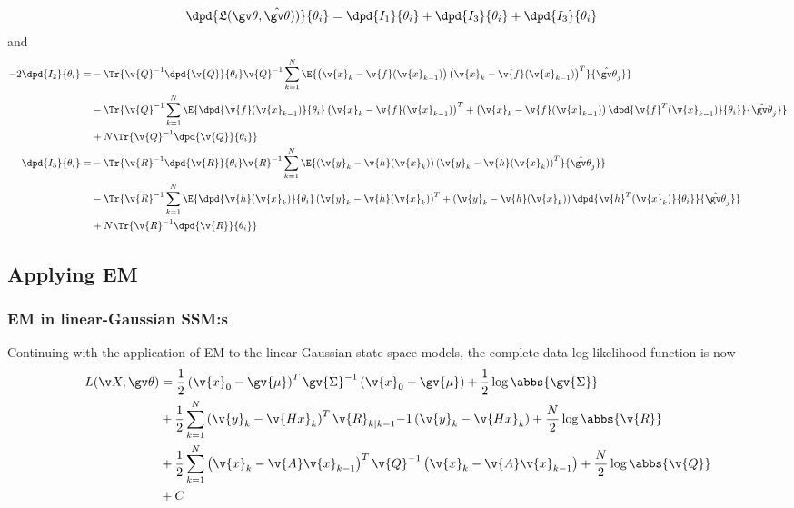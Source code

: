 \begin{align}
	\dpd{\Lb(\Th,\hat{\Th}))}{\theta_i}&=\dpd{I_1}{\theta_i}+\dpd{I_3}{\theta_i}+\dpd{I_3}{\theta_i}
	\label{eq:dLB_nonlinear_1}
\end{align}
and
\begin{align}
\begin{split}
	-2\dpd{I_2}{\theta_i}
	=&-\Tr{\v{Q}^{-1}\dpd{\v{Q}}{\theta_i}\v{Q}^{-1}
	\sum_{k=1}^N\E{\left(\v{x}_k-\v{f}(\v{x}_{k-1})\right)\left(\v{x}_k-\v{f}(\v{x}_{k-1})\right)^T}{\hat{\Th}_j}}\\
	&-\Tr{\v{Q}^{-1}\sum_{k=1}^N\E{\dpd{\v{f}(\v{x}_{k-1})}{\theta_i}\left(\v{x}_k-\v{f}(\v{x}_{k-1})\right)^T+\left(\v{x}_k-\v{f}(\v{x}_{k-1})\right)\dpd{\v{f}^T(\v{x}_{k-1})}{\theta_i}}{\hat{\Th}_j}}\\
	&+N\Tr{\v{Q}^{-1}\dpd{\v{Q}}{\theta_i}}\\
	\dpd{I_3}{\theta_i}=&
	-\Tr{\v{R}^{-1}\dpd{\v{R}}{\theta_i}\v{R}^{-1}
	\sum_{k=1}^N\E{\left(\v{y}_k-\v{h}(\v{x}_{k})\right)\left(\v{y}_k-\v{h}(\v{x}_{k})\right)^T}{\hat{\Th}_j}}\\
	&-\Tr{\v{R}^{-1}\sum_{k=1}^N\E{\dpd{\v{h}(\v{x}_{k})}{\theta_i}\left(\v{y}_k-\v{h}(\v{x}_{k})\right)^T+\left(\v{y}_k-\v{h}(\v{x}_{k})\right)\dpd{\v{h}^T(\v{x}_{k})}{\theta_i}}{\hat{\Th}_j}}\\
	&+N\Tr{\v{R}^{-1}\dpd{\v{R}}{\theta_i}}\\
	\label{eq:dLB_nonlinear}
\end{split}
\end{align}

\subsection{Applying EM}%

\subsubsection{EM in linear-Gaussian SSM:s}
\parencite{shumway1982approach,Ghahramani1996}
Continuing with the application of EM to the linear-Gaussian state space models, 
the complete-data log-likelihood function is now
\begin{align}
\label{eq:clLH}
\begin{split}
	L(\X,\Th)&=
	\frac{1}{2}\left(\v{x}_0-\gv{\mu}\right)^T\gv{\Sigma}^{-1}\left(\v{x}_0-\gv{\mu}\right)+\frac{1}{2}\log\abbs{\gv{\Sigma}}\\
	&+\frac{1}{2}\sum_{k=1}^N\left(\v{y}_k-\v{Hx}_k\right)^T\v{R}_{k|k-1}{-1}\left(\v{y}_k-\v{Hx}_k\right)+\frac{N}{2}\log\abbs{\v{R}}\\
	&+\frac{1}{2}\sum_{k=1}^N\left(\v{x}_k-\v{A}\v{x}_{k-1}\right)^T\v{Q}^{-1}\left(\v{x}_k-\v{A}\v{x}_{k-1}\right)+\frac{N}{2}\log\abbs{\v{Q}}\\
	&+C
\end{split}
\end{align}


